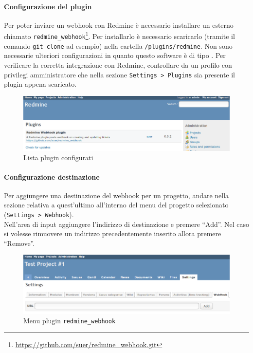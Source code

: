 	\paragraph{Configurazione del plugin}
	Per poter inviare un webhook con Redmine è necessario installare un  esterno chiamato \texttt{redmine\_webhook}\footnote{\url{https://github.com/suer/redmine_webhook.git}}.
	Per installarlo è necessario scaricarlo (tramite il comando \texttt{git clone} ad esempio) nella cartella \texttt{/plugins/redmine}.
	Non sono necessarie ulteriori configurazioni in quanto questo software è di tipo .
	Per verificare la corretta integrazione con Redmine, controllare da un profilo con privilegi amministratore che nella sezione \texttt{Settings > Plugins} sia presente il plugin appena scaricato.
	\begin{figure}[H]
		\centering
		\includegraphics[width=14cm]{img/redmine_webhook_admin.png}
		\caption{Lista plugin configurati}
	\end{figure}


	\paragraph{Configurazione destinazione}
	Per aggiungere una destinazione del webhook per un progetto, andare nella sezione relativa a quest'ultimo all'interno del menu del progetto selezionato (\texttt{Settings > Webhook}).\\
	Nell'area di input aggiungere l'indirizzo di destinazione e premere ``Add''. Nel caso si volesse rimuovere un indirizzo precedentemente inserito allora premere ``Remove''.
	\begin{figure}[H]
		\centering
		\includegraphics[width=14cm]{img/redmine_webhook_menu.png}
		\caption{Menu plugin \texttt{redmine\_webhook}}
	\end{figure}
